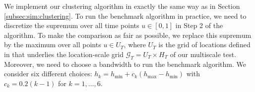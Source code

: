 \documentclass[12pt]{article}
\makeatletter
\renewcommand{\eqref}[1]{\tagform@{\ref{#1}}}
\makeatother
\begin{document}
We implement our clustering algorithm in exactly the same way as in Section \ref{subsec:sim:clustering}. To run the benchmark algorithm in practice, we need to discretize the supremum over all time points $u \in [0,1]$ in Step 2 of the algorithm. To make the comparison as fair as possible, we replace this supremum by the maximum over all points $u \in U_T$, where $U_T$ is the grid of locations defined in \eqref{eq:grid-loc} that underlies the location-scale grid $\mathcal{G}_T = U_T \times H_T$ of our multiscale test. Moreover, we need to choose a bandwidth to run the benchmark algorithm. We consider six different choices: $h_k = h_{\min} + c_k (h_{\max} - h_{\min})$ with $c_k = 0.2(k-1)$ for $k=1,\ldots,6$.



\begin{table}[t!]
\centering
\caption{Empirical probabilities that $\{ \widehat{G}_1,\ldots,\widehat{G}_{\widehat{N}}\} = \{ G_1,G_2,G_3\}$ for the proposed clustering approach with estimated long-run variance ($\mathcal{T}_{\text{MS}}$) and with true theoretical value of the long-run variance ($\mathcal{T}_{\text{MS, true lrv}}$) and the benchmark procedures $\mathcal{T}_{\text{bmk, }1} - \mathcal{T}_{\text{bmk, }6}$ corresponding to bandwidths $h_1 - h_6$ for different sample sizes $T$.}\label{tab:clustering:comparison}
{\color{red}}
\end{table}
\end{document}
